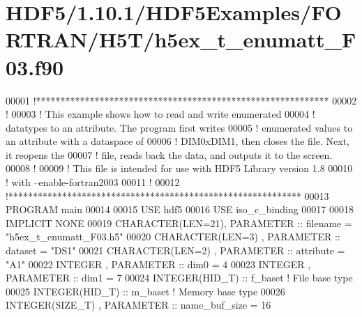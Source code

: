 \hypertarget{_h_d_f5_21_810_81_2_h_d_f5_examples_2_f_o_r_t_r_a_n_2_h5_t_2h5ex__t__enumatt___f03_8f90_source}{}\section{H\+D\+F5/1.10.1/\+H\+D\+F5\+Examples/\+F\+O\+R\+T\+R\+A\+N/\+H5\+T/h5ex\+\_\+t\+\_\+enumatt\+\_\+\+F03.f90}
\label{_h_d_f5_21_810_81_2_h_d_f5_examples_2_f_o_r_t_r_a_n_2_h5_t_2h5ex__t__enumatt___f03_8f90_source}

\begin{DoxyCode}
00001 \textcolor{comment}{!************************************************************}
00002 \textcolor{comment}{!}
00003 \textcolor{comment}{!  This example shows how to read and write enumerated}
00004 \textcolor{comment}{!  datatypes to an attribute.  The program first writes}
00005 \textcolor{comment}{!  enumerated values to an attribute with a dataspace of}
00006 \textcolor{comment}{!  DIM0xDIM1, then closes the file.  Next, it reopens the}
00007 \textcolor{comment}{!  file, reads back the data, and outputs it to the screen.}
00008 \textcolor{comment}{!}
00009 \textcolor{comment}{!  This file is intended for use with HDF5 Library version 1.8}
00010 \textcolor{comment}{!  with --enable-fortran2003}
00011 \textcolor{comment}{!}
00012 \textcolor{comment}{!************************************************************}
00013 \textcolor{keyword}{PROGRAM} main
00014 
00015   \textcolor{keywordtype}{USE }hdf5
00016   \textcolor{keywordtype}{USE }iso\_c\_binding
00017 
00018   \textcolor{keywordtype}{IMPLICIT NONE}
00019   \textcolor{keywordtype}{CHARACTER(LEN=21)}, \textcolor{keywordtype}{PARAMETER} :: filename  = \textcolor{stringliteral}{"h5ex\_t\_enumatt\_F03.h5"}
00020   \textcolor{keywordtype}{CHARACTER(LEN=3)} , \textcolor{keywordtype}{PARAMETER} :: dataset   = \textcolor{stringliteral}{"DS1"}
00021   \textcolor{keywordtype}{CHARACTER(LEN=2)} , \textcolor{keywordtype}{PARAMETER} :: attribute = \textcolor{stringliteral}{"A1"}
00022   \textcolor{keywordtype}{INTEGER}          , \textcolor{keywordtype}{PARAMETER} :: dim0      = 4
00023   \textcolor{keywordtype}{INTEGER}          , \textcolor{keywordtype}{PARAMETER} :: dim1      = 7
00024   \textcolor{keywordtype}{INTEGER(HID\_T)}               :: f\_baset  \textcolor{comment}{! File base type}
00025   \textcolor{keywordtype}{INTEGER(HID\_T)}               :: m\_baset  \textcolor{comment}{! Memory base type}
00026   \textcolor{keywordtype}{INTEGER(SIZE\_T)}  , \textcolor{keywordtype}{PARAMETER} :: name\_buf\_size = 16

\end{DoxyCode}
